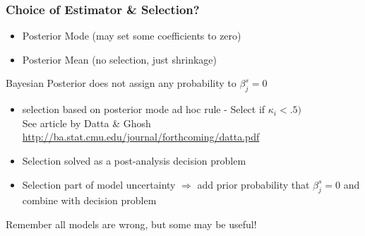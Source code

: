 \documentclass[handout]{beamer}
\begin{document}
\begin{frame}
  \frametitle{Choice of Estimator \& Selection?}

  \begin{itemize}
  \item Posterior Mode (may set some coefficients to zero) \pause
  \item Posterior Mean (no selection, just shrinkage) \pause
  \end{itemize}
  Bayesian Posterior does not assign any probability to $\beta^s_j = 0$ \pause

  \begin{itemize}
  \item selection based on posterior mode ad hoc rule - Select if
    $\kappa_i < .5)$ \pause \\
See  article by  Datta \& Ghosh
\url{http://ba.stat.cmu.edu/journal/forthcoming/datta.pdf} \pause
  \item Selection solved as a post-analysis decision problem \pause
  \item Selection part of model uncertainty $\Rightarrow$ add prior \pause
    probability that $\beta^s_j = 0$  and combine with decision problem 
  \end{itemize}
Remember all models are wrong, but some may be useful!
\end{frame}
\end{document}
